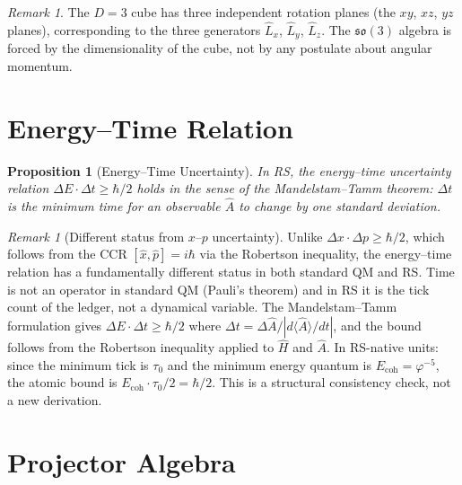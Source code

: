 \documentclass[12pt,a4paper]{article}
\newtheorem{proposition}[theorem]{Proposition}
\theoremstyle{definition}
\theoremstyle{remark}
\newtheorem{remark}[theorem]{Remark}
\begin{document}
\begin{remark}
The $D = 3$ cube has three independent rotation planes
(the $xy$, $xz$, $yz$ planes), corresponding to the three
generators $\hat{L}_x$, $\hat{L}_y$, $\hat{L}_z$.  The
$\mathfrak{so}(3)$ algebra is forced by the dimensionality of
the cube, not by any postulate about angular momentum.
\end{remark}

\section{Energy--Time Relation}
\label{sec:energy-time}

\begin{proposition}[Energy--Time Uncertainty]
\label{thm:et}
In RS, the energy--time uncertainty relation
$\Delta E \cdot \Delta t \geq \hbar/2$ holds in the
sense of the Mandelstam--Tamm theorem: $\Delta t$ is the
minimum time for an observable $\hat{A}$ to change by one
standard deviation.
\end{proposition}

\begin{remark}[Different status from $x$--$p$ uncertainty]
\label{rem:et-status}
Unlike $\Delta x \cdot \Delta p \geq \hbar/2$, which follows
from the CCR $[\hat{x}, \hat{p}] = i\hbar$ via the Robertson
inequality, the energy--time relation has a fundamentally
different status in both standard QM and RS.  Time is not an
operator in standard QM (Pauli's theorem) and in RS it is the
tick count of the ledger, not a dynamical variable.  The
Mandelstam--Tamm formulation gives $\Delta E \cdot \Delta t
\geq \hbar/2$ where $\Delta t = \Delta\hat{A} /
|d\langle\hat{A}\rangle/dt|$, and the bound follows from
the Robertson inequality applied to $\hat{H}$ and $\hat{A}$.
In RS-native units: since the minimum tick is $\tau_0$ and the
minimum energy quantum is $E_\mathrm{coh} = \varphi^{-5}$,
the atomic bound is $E_\mathrm{coh} \cdot \tau_0 / 2 =
\hbar/2$.  This is a structural consistency check, not a
new derivation.
\end{remark}

\section{Projector Algebra}
\label{sec:projector}
\end{document}

